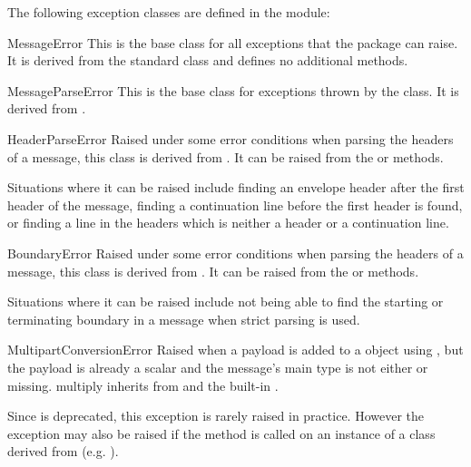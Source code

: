 
The following exception classes are defined in the
 module:

\begin{excclassdesc}{MessageError}{}
This is the base class for all exceptions that the 
package can raise.  It is derived from the standard
 class and defines no additional methods.
\end{excclassdesc}

\begin{excclassdesc}{MessageParseError}{}
This is the base class for exceptions thrown by the 
class.  It is derived from .
\end{excclassdesc}

\begin{excclassdesc}{HeaderParseError}{}
Raised under some error conditions when parsing the  headers of
a message, this class is derived from .
It can be raised from the  or
 methods.

Situations where it can be raised include finding an envelope
header after the first  header of the message, finding a
continuation line before the first  header is found, or finding
a line in the headers which is neither a header or a continuation
line.
\end{excclassdesc}

\begin{excclassdesc}{BoundaryError}{}
Raised under some error conditions when parsing the  headers of
a message, this class is derived from .
It can be raised from the  or
 methods.

Situations where it can be raised include not being able to find the
starting or terminating boundary in a  message
when strict parsing is used.
\end{excclassdesc}

\begin{excclassdesc}{MultipartConversionError}{}
Raised when a payload is added to a  object using
, but the payload is already a scalar and the
message's  main type is not either
 or missing.  
multiply inherits from  and the built-in
.

Since  is deprecated, this exception is
rarely raised in practice.  However the exception may also be raised
if the  method is called on an instance of a class
derived from  (e.g. ).
\end{excclassdesc}

